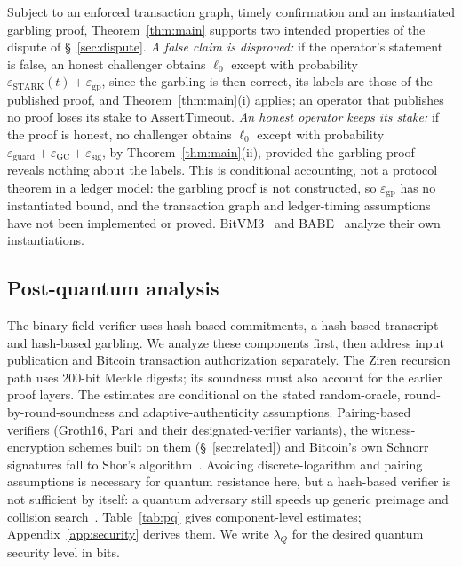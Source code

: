 \documentclass[11pt]{article}
\begin{document}
Subject to an enforced transaction graph, timely confirmation and an
instantiated garbling proof, Theorem~\ref{thm:main} supports two intended
properties of the dispute of \S~\ref{sec:dispute}. \emph{A false claim is
disproved:} if the operator's statement is false, an honest challenger obtains $\ell_0$ except with probability
$\varepsilon_{\mathrm{STARK}}(t)+\varepsilon_{\mathrm{gp}}$,
since the garbling is then correct, its labels are those of the
published proof, and Theorem~\ref{thm:main}(i) applies; an operator that
publishes no proof loses its stake to AssertTimeout. \emph{An honest operator
keeps its stake:} if the proof is honest, no challenger obtains $\ell_0$
except with probability
$\varepsilon_{\mathrm{guard}}+\varepsilon_{\mathrm{GC}}+\varepsilon_{\mathrm{sig}}$,
by Theorem~\ref{thm:main}(ii), provided the garbling proof reveals nothing
about the labels. This
is conditional accounting, not a protocol theorem in a ledger model:
the garbling proof is not constructed, so $\varepsilon_{\mathrm{gp}}$ has no
instantiated bound, and the transaction
graph and ledger-timing assumptions have not been implemented or proved.
BitVM3~\cite{bitvm3paper} and BABE~\cite{babe2026} analyze their own
instantiations.

\subsection{Post-quantum analysis}\label{sec:pq}

The binary-field verifier uses hash-based commitments, a hash-based
transcript and hash-based garbling. We analyze these components first, then
address input publication and Bitcoin transaction authorization separately.
The Ziren recursion path uses 200-bit Merkle digests; its soundness must
also account for the earlier proof layers.
The estimates are conditional on the stated random-oracle,
round-by-round-soundness and adaptive-authenticity assumptions.
Pairing-based verifiers (Groth16, Pari and their designated-verifier variants),
the witness-encryption schemes built on them (\S~\ref{sec:related}) and Bitcoin's
own Schnorr signatures fall to Shor's algorithm~\cite{shor94}. Avoiding
discrete-logarithm and pairing assumptions is necessary for
quantum resistance here, but a hash-based verifier is not sufficient by
itself: a quantum adversary still speeds up generic preimage and collision
search~\cite{grover96,bht98}. Table~\ref{tab:pq} gives component-level
estimates; Appendix~\ref{app:security} derives them. We write $\lambda_Q$
for the desired quantum security level in bits.
\end{document}
